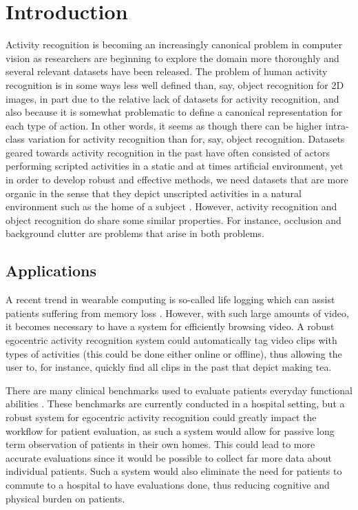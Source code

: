 \documentclass[10pt,twocolumn,letterpaper]{article}
\begin{document}
\section{Introduction}
	Activity recognition is becoming an increasingly canonical problem in
	computer vision as researchers are beginning to explore the domain more
	thoroughly and several relevant datasets have been released. The problem 
	of human activity recognition is in some ways less well defined
	than, say, object recognition for 2D images, in part due to the relative
	lack of datasets for activity recognition, and also because it is somewhat
	problematic to define a canonical representation for each type of action.
	In other words, it seems as though there can be higher intra-class
	variation for activity recognition than for, say, object recognition. 
	Datasets geared towards activity recognition in the past have often
	consisted of actors performing scripted activities in a static and at
	times artificial environment, yet in order to develop robust and effective
	methods, we need datasets that are more organic in the sense that they
	depict unscripted activities in a natural environment such as the home of
	a subject \cite{Ramanan12}. 
	However, activity recognition and object recognition do share some
	similar properties. For instance, occlusion and background clutter are
	problems that arise in both problems.

\subsection{Applications}
	A recent trend in wearable computing is so-called life logging which can
	assist patients suffering from memory loss \cite{Sellen07}. However, with
	such large amounts of video, it becomes necessary to have a system for
	efficiently browsing video. A robust egocentric activity recognition
	system could automatically tag video clips with types of activities (this
	could be done either online or offline), thus allowing the user to, for
	instance, quickly find all clips in the past that depict making tea.

	There are many clinical benchmarks used to evaluate patients everyday
	functional abilities \cite{Kopp97, Catz97, Itzkovich07}. 
	These benchmarks are currently conducted in a
	hospital setting, but a robust system for egocentric activity recognition
	could greatly impact the workflow for patient evaluation, as such a system
	would allow for passive long term observation of patients in their own
	homes. This could lead to more accurate evaluations since it would be
	possible to collect far more data about individual patients. Such a system
	would also eliminate the need for patients to commute to a hospital to have
	evaluations done, thus reducing cognitive and physical burden on patients.
	
\end{document}
